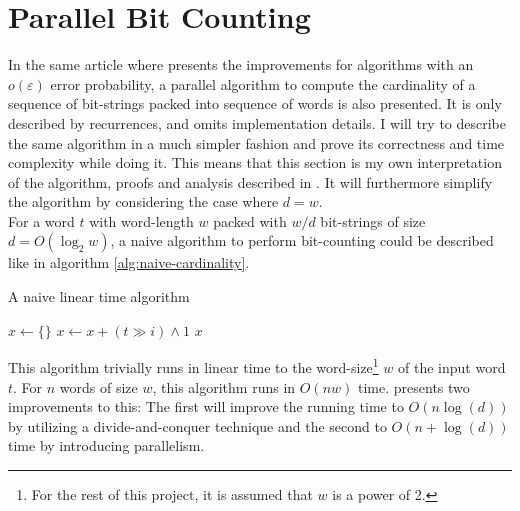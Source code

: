 \section{Parallel Bit Counting}
In the same article where \citet{fast-similarity-search} presents the improvements for algorithms with an $o(\varepsilon)$ error probability, a parallel algorithm to compute the cardinality of a sequence of bit-strings packed into sequence of words is also presented. It is only described by recurrences, and omits implementation details. I will try to describe the same algorithm in a much simpler fashion and prove its correctness and time complexity while doing it. This means that this section is my own interpretation of the algorithm, proofs and analysis described in \cite{fast-similarity-search}.
It will furthermore simplify the algorithm by considering the case where $d=w$.\\
For a word $t$ with word-length $w$ packed with $w/d$ bit-strings of size $d = O(\log_2{w})$, a naive algorithm to perform bit-counting could be described like in algorithm \ref{alg:naive-cardinality}.
\begin{algorithm}[H]
\caption{A naive linear time algorithm}\label{alg:naive-cardinality}
\begin{algorithmic}[1]
\State $x \gets \{\}$
\State $x \gets x + (t \gg i) \land 1$
\EndFor
\EndFor
\State \Return $x$
\EndFunction
\end{algorithmic}
\end{algorithm}
This algorithm trivially runs in linear time to the word-size\footnote{For the rest of this project, it is assumed that $w$ is a power of 2.} $w$ of the input word $t$. For $n$ words of size $w$, this algorithm runs in $O(nw)$ time.
\citet{fast-similarity-search} presents two improvements to this: The first will improve the running time to $O(n\log(d))$ by utilizing a divide-and-conquer technique and the second to $O(n + \log(d))$ time by introducing parallelism. %
